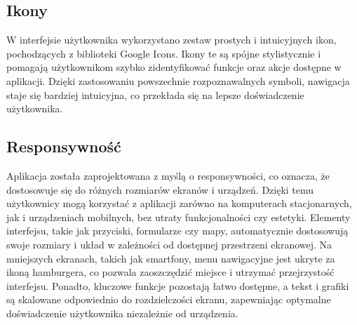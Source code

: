 \subsection{Ikony}
W interfejsie użytkownika wykorzystano zestaw prostych i intuicyjnych ikon, pochodzących z biblioteki Google Icons. Ikony te są spójne stylistycznie i pomagają użytkownikom szybko zidentyfikować funkcje oraz akcje dostępne w aplikacji. Dzięki zastosowaniu powszechnie rozpoznawalnych symboli, nawigacja staje się bardziej intuicyjna, co przekłada się na lepsze doświadczenie użytkownika.

\subsection{Responsywność}
Aplikacja została zaprojektowana z myślą o responsywności, co oznacza, że dostosowuje się do różnych rozmiarów ekranów i urządzeń. Dzięki temu użytkownicy mogą korzystać z aplikacji zarówno na komputerach stacjonarnych, jak i urządzeniach mobilnych, bez utraty funkcjonalności czy estetyki. Elementy interfejsu, takie jak przyciski, formularze czy mapy, automatycznie dostosowują swoje rozmiary i układ w zależności od dostępnej przestrzeni ekranowej. Na mniejszych ekranach, takich jak smartfony, menu nawigacyjne jest ukryte za ikoną hamburgera, co pozwala zaoszczędzić miejsce i utrzymać przejrzystość interfejsu. Ponadto, kluczowe funkcje pozostają łatwo dostępne, a tekst i grafiki są skalowane odpowiednio do rozdzielczości ekranu, zapewniając optymalne doświadczenie użytkownika niezależnie od urządzenia.
